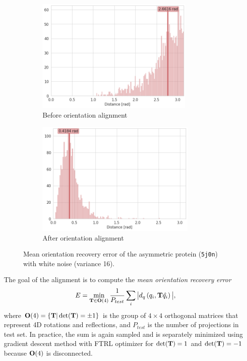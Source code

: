 \begin{figure}
    \centering
    \begin{subfigure}[b]{0.45\textwidth}
        \includegraphics[height=5.7cm]{images/5j0n_noise16_angle_alignment_before.png}
        \caption{Before orientation alignment}
    \end{subfigure}
    \hfill
    \begin{subfigure}[b]{0.5\textwidth}
    \centering
        \includegraphics[height=5.7cm]{images/5j0n_noise16_angle_alignment_after.png}
        \caption{After orientation alignment}
    \end{subfigure}
    \caption{
        Mean orientation recovery error of the asymmetric protein (\texttt{5j0n}) with white noise (variance 16).
}
    \label{fig:angle-alignment-5j0n-noise16}
\end{figure}

The goal of the alignment is to compute the \textit{mean orientation recovery error}
\begin{equation}
    E = \min_{\mathbf{T} \in \mathrm{\mathbf{O}}(4)} \frac{1}{P_{test}} \sum_{i} \big| d_q\left( q_i, \mathbf{T} \hat{q_i} \right) \big|,
    \label{eqn:orientation-recovery-error}
\end{equation}
where $\mathrm{\mathbf{O}}(4) = \{\mathbf{T} | \det(\mathbf{T}) = \pm 1\}$ is the group of $4 \times 4$ orthogonal matrices that represent 4D rotations and reflections, and $P_{test}$ is the number of projections in test set.
In practice, the sum is again sampled and  is separately minimized using gradient descent method with FTRL optimizer \cite{TODO} for $\det(\mathbf{T}) = 1$ and $\det(\mathbf{T}) = -1$ because $\mathrm{\mathbf{O}}(4)$ is disconnected.

